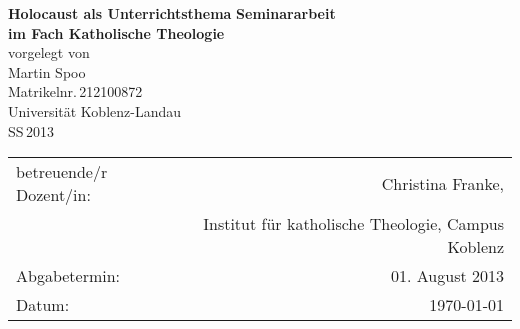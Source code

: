 \begin{titlepage}
	\begin{center}
		\quad
		\vfill
		\Huge{
			 \textbf{Holocaust als Unterrichtsthema}
		}
		\vspace{5mm}
		\vfill
		\large{
			{\bf Seminararbeit\\
			im Fach Katholische Theologie}
		}
		\\
		\vspace{0.5cm}
		\large{
			{vorgelegt von\\
			Martin Spoo\\
			Matrikelnr.\,212100872}
		}
		\vspace{1cm}
		\\
		\Large{
			{Universität Koblenz-Landau}\\
			{SS\,2013}
		}
		\vspace{1cm}
		\begin{table}[b]
			\begin{center}
				\begin{tabular}{lr}
					betreuende/r Dozent/in: & Christina Franke, \\
								&	Institut für katholische Theologie, Campus Koblenz \\
					\vspace{0.5cm}
					Abgabetermin: & 01. August 2013 \\
					Datum: & \today
				\end{tabular}
			\end{center}
		\end{table}
	\end{center}
\end{titlepage}
\renewcommand{\baselinestretch}{1.1}
\restoregeometry

